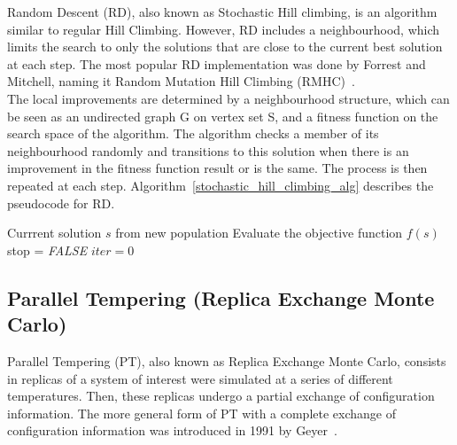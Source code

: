 Random Descent (RD), also known as Stochastic Hill climbing, is an algorithm similar to regular Hill Climbing. However, RD includes a neighbourhood, which limits the search to only the solutions that are close to the current best solution at each step. The most popular RD implementation was done by Forrest and Mitchell, naming it Random Mutation Hill Climbing (RMHC)~\cite{mitchell1994will}.\\

The local improvements are determined by a neighbourhood structure, which can be seen as an undirected graph G on vertex set S, and a fitness function on the search space of the algorithm. The algorithm checks a member of its neighbourhood randomly and transitions to this solution when there is an improvement in the fitness function result or is the same. The process is then repeated at each step.%
%
Algorithm~\ref{stochastic_hill_climbing_alg} describes the pseudocode for RD.

\begin{algorithm}[H]
\caption{Pseudocode for stochastic hill climbing}
\label{stochastic_hill_climbing_alg}
\SetAlgoLined
    Currrent solution $s$ from new population\;
    Evaluate the objective function $f(s)$\;
    stop = \textit{FALSE}\;
    $iter = 0$\;
\end{algorithm}

\subsection{Parallel Tempering (Replica Exchange Monte Carlo)} 

Parallel Tempering (PT), also known as Replica Exchange Monte Carlo, consists in replicas of a system of interest were simulated at a series of different temperatures. Then, these replicas undergo a partial exchange of configuration information. The more general form of PT with a complete exchange of configuration information was introduced in 1991 by Geyer~\cite{B509983H}. \\

